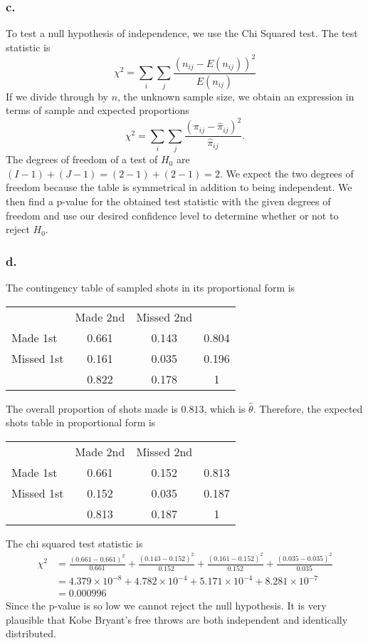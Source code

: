 \documentclass{article}
\begin{document}
\subsubsection{c.}
To test a null hypothesis of independence, we use the Chi Squared test. The test statistic is 
\[\chi^2 = \sum_{i}\sum_{j}\frac{\left(n_{ij}-E(n_{ij})\right)^2}{E(n_{ij})}\]
If we divide through by $n$, the unknown sample size, we obtain an expression in terms of sample and expected proportions
\[\chi^2 = \sum_{i}\sum_{j}\frac{\left(\pi_{ij}-\hat\pi_{ij}\right)^2}{\hat\pi_{ij}}.\]
The degrees of freedom of a test of $H_0$ are $(I-1) + (J-1) = (2-1) + (2-1) = 2$. We expect the two degrees of freedom because the table is symmetrical in addition to being independent.
We then find a p-value for the obtained test statistic with the given degrees of freedom and use our desired confidence level to determine whether or not to reject $H_0$.

\subsubsection{d.}
The contingency table of sampled shots in its proportional form is
\begin{center}
\begin{tabular}{lcc|c}
&Made 2nd&Missed 2nd&\\
Made 1st&0.661&0.143&0.804 \\ 
Missed 1st&0.161&0.035&0.196 \\ \hline
&0.822&0.178&1 \\ 
\end{tabular}
\end{center}
The overall proportion of shots made is $0.813$, which is $\hat\theta$. Therefore, the expected shots table in proportional form is
\begin{center}
\begin{tabular}{lcc|c}
&Made 2nd&Missed 2nd&\\
Made 1st&0.661&0.152&0.813 \\ 
Missed 1st&0.152&0.035&0.187 \\ \hline
&0.813&0.187&1 \\ 
\end{tabular}
\end{center}
The chi squared test statistic is
\begin{align*}
\chi^2 &= \frac{(0.661-0.661)^2}{0.661} + \frac{(0.143-0.152)^2}{0.152} + \frac{(0.161-0.152)^2}{0.152} + \frac{(0.035-0.035)^2}{0.035} \\
&=4.379\times10^{-8} + 4.782\times10^{-4} + 5.171\times10^{-4} + 8.281\times10^{-7} \\
&= 0.000996
\end{align*}
Since the p-value is so low we cannot reject the null hypothesis. It is very plausible that Kobe Bryant's free throws are both independent and identically distributed. 


\end{document}

